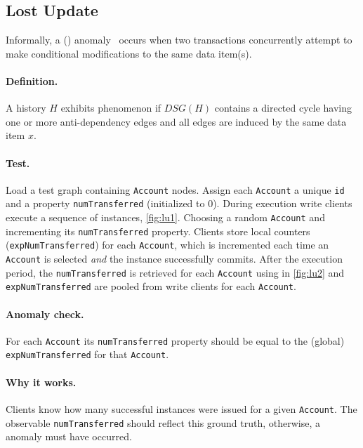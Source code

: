 \subsection{Lost Update}
\label{sec:lost-update}

Informally, a  ()
anomaly~\cite{DBLP:journals/tods/BailisFGHS16} occurs when two transactions
concurrently attempt to make conditional modifications to the same data item(s).

\paragraph{Definition.}
A history $H$ exhibits phenomenon  if $\textit{DSG}(H)$ contains a
directed cycle having one or more anti-dependency edges and all edges are induced
by the same data item $x$.

\paragraph{Test.}
Load a test graph containing \texttt{Account} nodes. Assign each \texttt{Account}
a unique \texttt{id} and a property \texttt{numTransferred} (initialized to 0).
During execution write clients execute a sequence of 
instances, \autoref{fig:lu1}. Choosing a random \texttt{Account} and incrementing
its \texttt{numTransferred} property. Clients store local counters
(\texttt{expNumTransferred}) for each \texttt{Account}, which is incremented
each time an \texttt{Account} is selected \emph{and} the 
instance successfully commits. After the execution period, the
\texttt{numTransferred} is retrieved for each \texttt{Account} using
 in \autoref{fig:lu2} and \texttt{expNumTransferred} are
pooled from write clients for each \texttt{Account}.

\paragraph{Anomaly check.}
For each \texttt{Account} its \texttt{numTransferred} property should be equal
to the (global) \texttt{expNumTransferred} for that \texttt{Account}.

\paragraph{Why it works.}
Clients know how many successful  instances were issued
for a given \texttt{Account}. The observable \texttt{numTransferred} should
reflect this ground truth, otherwise, a  anomaly must have occurred.

